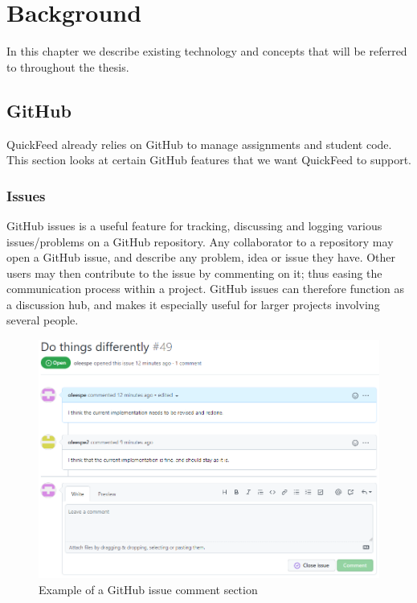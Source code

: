 
\chapter{Background}
\label{ch:background}

In this chapter we describe existing technology and concepts that will be referred to throughout the thesis.

\section{GitHub}

QuickFeed already relies on GitHub to manage assignments and student code.
This section looks at certain GitHub features that we want QuickFeed to support.

\subsection{Issues}

GitHub issues is a useful feature for tracking, discussing and logging various issues/problems on a GitHub repository.
Any collaborator to a repository may open a GitHub issue, and describe any problem, idea or issue they have.
Other users may then contribute to the issue by commenting on it; thus easing the communication process within a project.
GitHub issues can therefore function as a discussion hub, and makes it especially useful for larger projects involving several people. 

\begin{figure}[ht]
    \centering
    \includegraphics[width=\textwidth]{photos/github-issue.PNG}
    \caption{Example of a GitHub issue comment section}
    \label{fig:github-issue}
\end{figure}

